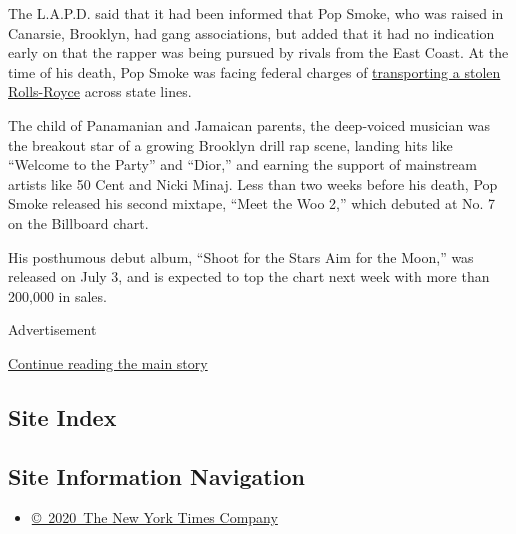 The L.A.P.D. said that it had been informed that Pop Smoke, who was
raised in Canarsie, Brooklyn, had gang associations, but added that it
had no indication early on that the rapper was being pursued by rivals
from the East Coast. At the time of his death, Pop Smoke was facing
federal charges of
\href{https://www.nytimes3xbfgragh.onion/2020/01/17/nyregion/pop-smoke-stolen-rolls-royce.html}{transporting
a stolen Rolls-Royce} across state lines.

The child of Panamanian and Jamaican parents, the deep-voiced musician
was the breakout star of a growing Brooklyn drill rap scene, landing
hits like ``Welcome to the Party'' and ``Dior,'' and earning the support
of mainstream artists like 50 Cent and Nicki Minaj. Less than two weeks
before his death, Pop Smoke released his second mixtape, ``Meet the Woo
2,'' which debuted at No. 7 on the Billboard chart.

His posthumous debut album, ``Shoot for the Stars Aim for the Moon,''
was released on July 3, and is expected to top the chart next week with
more than 200,000 in sales.

Advertisement

\protect\hyperlink{after-bottom}{Continue reading the main story}

\hypertarget{site-index}{%
\subsection{Site Index}\label{site-index}}

\hypertarget{site-information-navigation}{%
\subsection{Site Information
Navigation}\label{site-information-navigation}}

\begin{itemize}
\tightlist
\item
  \href{https://help.nytimes3xbfgragh.onion/hc/en-us/articles/115014792127-Copyright-notice}{©~2020~The
  New York Times Company}
\end{itemize}

